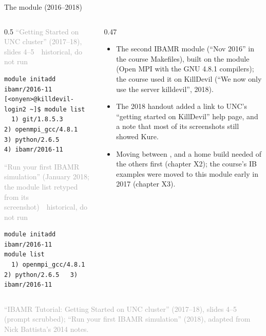 \documentclass[aspectratio=169,11pt]{beamer}
\newcommand{\sourcecredit}[1]{\vfill\begin{flushright}\tiny\textcolor{DarkGray}{#1}\end{flushright}}
\newcommand{\hist}[1]{{\tiny\sffamily\textcolor{DarkGray}{#1\ \textbullet\ historical, do not run}}\par\nointerlineskip\vspace{0.3mm}}
\begin{document}
\begin{frame}[fragile]{The  module (2016--2018)}
\label{fr:m201611}
\begin{columns}[T,onlytextwidth]
\begin{column}{0.5\textwidth}
\hist{``Getting Started on UNC cluster'' (2017--18), slides 4--5}
\begin{lstlisting}[style=hist]
module initadd ibamr/2016-11
[<onyen>@killdevil-login2 ~]$ module list
  1) git/1.8.5.3         2) openmpi_gcc/4.8.1   3) python/2.6.5        4) ibamr/2016-11
\end{lstlisting}
\hist{``Run your first IBAMR simulation'' (January 2018; the module list retyped from its screenshot)}
\begin{lstlisting}[style=hist]
module initadd ibamr/2016-11
module list
  1) openmpi_gcc/4.8.1   2) python/2.6.5   3) ibamr/2016-11
\end{lstlisting}
\end{column}
\begin{column}{0.47\textwidth}
\footnotesize
\begin{itemize}\setlength{\itemsep}{2pt}
  \item The second IBAMR module (``Nov 2016'' in the course Makefiles), built on the  module (Open MPI with the GNU 4.8.1 compilers); the course used it on KillDevil (``We now only use the server killdevil'', 2018).
  \item The 2018 handout added a link to UNC's ``getting started on KillDevil'' help page, and a note that most of its screenshots still showed Kure.
  \item Moving between ,  and a home build needed  of the others first (chapter X2); the course's IB examples were moved to this module early in 2017 (chapter X3).
\end{itemize}
\end{column}
\end{columns}
\sourcecredit{``IBAMR Tutorial: Getting Started on UNC cluster'' (2017--18), slides 4--5 (prompt scrubbed); ``Run your first IBAMR simulation'' (2018), adapted from Nick Battista's 2014 notes.}
\end{frame}
\end{document}
